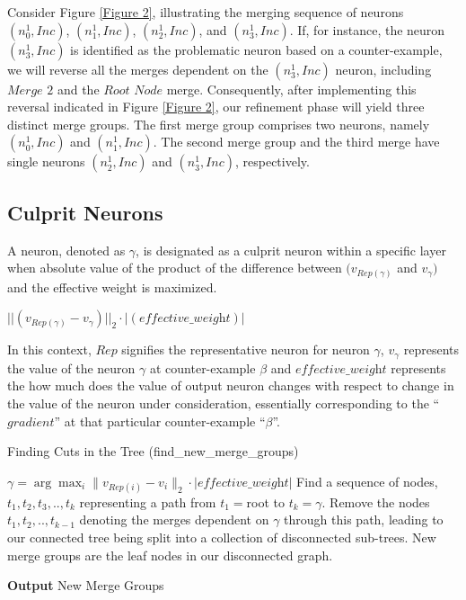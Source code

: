 Consider Figure \ref{Figure 2}, illustrating the merging sequence of neurons $(n_0^{1}, Inc)$, $(n_1^{1}, Inc)$, $(n_2^{1}, Inc)$, and $(n_3^{1}, Inc)$. If, for instance, the neuron $(n_3^{1}, Inc)$ is identified as the problematic neuron based on a counter-example, we will reverse all the merges dependent on the $(n_3^{1}, Inc)$ neuron, including $\textit{Merge 2}$ and the $\textit{Root Node}$ merge. Consequently, after implementing this reversal indicated in Figure \ref{Figure 2}, our refinement phase will yield three distinct merge groups. The first merge group comprises two neurons, namely $(n_0^1, Inc)$ and $(n_1^1, Inc)$. The second merge group and the third merge have single neurons $(n_2^1, Inc)$ and $(n_3^1, Inc)$, respectively.

\subsection{Culprit Neurons} 

A neuron, denoted as $\gamma$, is designated as a culprit neuron within a
specific layer when absolute value of the product of the difference between
$(v_{Rep(\gamma)}$ and $v_{\gamma})$ and the effective weight is maximized.

$||(v_{Rep(\gamma)} - v_{\gamma})||_{2} \cdot |(\textit{effective\_weight})|$

In this context, $Rep$ signifies the representative neuron for neuron $\gamma$, $v_{\gamma}$ represents the value of the neuron $\gamma$ at counter-example $\beta$ and $\textit{effective\_weight}$ represents the how much does the value of output neuron changes with respect to change in the value of the neuron under consideration, essentially corresponding to the ``$\textit{gradient}$'' at that particular counter-example ``$\beta$''.

\begin{algorithm}
    \caption{Finding Cuts in the Tree (find\_new\_merge\_groups)}
    \begin{algorithmic}[1]
        \State $\gamma= \arg \max_i \|v_{Rep(i)} -v_i \|_2 \cdot | \textit{effective\_weight}| $ 
        \State Find a sequence of nodes, $t_1,t_2,t_3,..,t_k$ representing a  path from $t_1=$root to $t_k=\gamma$.
        \State Remove the nodes $t_1,t_2,..,t_{k-1}$ denoting the merges dependent on $\gamma$ through this path, leading to our connected tree being split into a collection of disconnected sub-trees.
        \State New merge groups are the leaf nodes in our disconnected graph.
    \end{algorithmic}
    \hspace*{\algorithmicindent} \textbf{Output} New Merge Groups
\end{algorithm}

